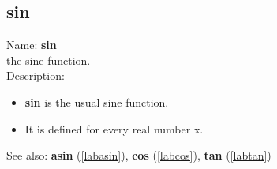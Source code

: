 \subsection{sin}
\label{labsin}
\noindent Name: \textbf{sin}\\
the sine function.\\

\noindent Description: \begin{itemize}

\item \textbf{sin} is the usual sine function.

\item It is defined for every real number x.
\end{itemize}
See also: \textbf{asin} (\ref{labasin}), \textbf{cos} (\ref{labcos}), \textbf{tan} (\ref{labtan})
